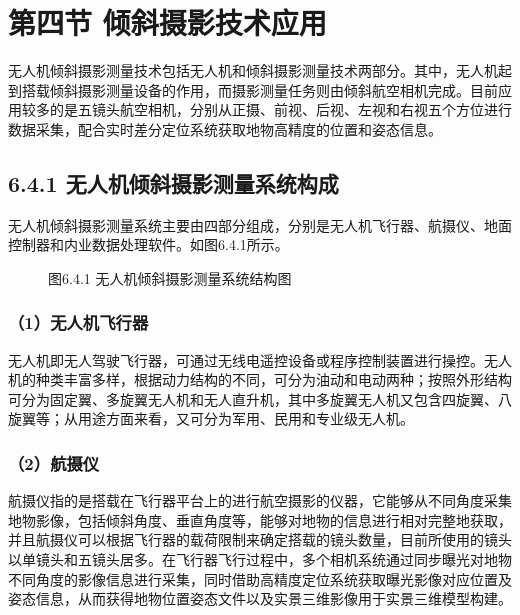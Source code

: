 \section{第四节
倾斜摄影技术应用}\label{ux7b2cux56dbux8282-ux503eux659cux6444ux5f71ux6280ux672fux5e94ux7528}

无人机倾斜摄影测量技术包括无人机和倾斜摄影测量技术两部分。其中，无人机起到搭载倾斜摄影测量设备的作用，而摄影测量任务则由倾斜航空相机完成。目前应用较多的是五镜头航空相机，分别从正摄、前视、后视、左视和右视五个方位进行数据采集，配合实时差分定位系统获取地物高精度的位置和姿态信息。

\subsection{6.4.1
无人机倾斜摄影测量系统构成}\label{ux65e0ux4ebaux673aux503eux659cux6444ux5f71ux6d4bux91cfux7cfbux7edfux6784ux6210}

无人机倾斜摄影测量系统主要由四部分组成，分别是无人机飞行器、航摄仪、地面控制器和内业数据处理软件。如图6.4.1所示。

\begin{figure}
\centering

\caption{图6.4.1 无人机倾斜摄影测量系统结构图}
\end{figure}

\subsubsection{（1）无人机飞行器}\label{ux65e0ux4ebaux673aux98deux884cux5668}

无人机即无人驾驶飞行器，可通过无线电遥控设备或程序控制装置进行操控。无人机的种类丰富多样，根据动力结构的不同，可分为油动和电动两种；按照外形结构可分为固定翼、多旋翼无人机和无人直升机，其中多旋翼无人机又包含四旋翼、八旋翼等；从用途方面来看，又可分为军用、民用和专业级无人机。

\subsubsection{（2）航摄仪}\label{ux822aux6444ux4eea}

航摄仪指的是搭载在飞行器平台上的进行航空摄影的仪器，它能够从不同角度采集地物影像，包括倾斜角度、垂直角度等，能够对地物的信息进行相对完整地获取，并且航摄仪可以根据飞行器的载荷限制来确定搭载的镜头数量，目前所使用的镜头以单镜头和五镜头居多。在飞行器飞行过程中，多个相机系统通过同步曝光对地物不同角度的影像信息进行采集，同时借助高精度定位系统获取曝光影像对应位置及姿态信息，从而获得地物位置姿态文件以及实景三维影像用于实景三维模型构建。

